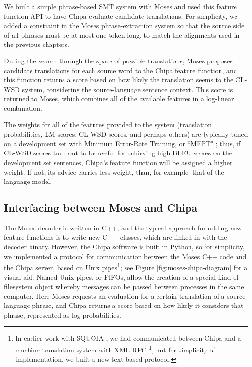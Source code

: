 We built a simple phrase-based SMT system with Moses and used this feature
function API to have Chipa evaluate candidate translations. For simplicity, we
added a constraint in the Moses phrase-extraction system so that the source side
of all phrases must be at most one token long, to match the alignments used in
the previous chapters.

During the search through the space of possible translations, Moses proposes
candidate translations for each source word to the Chipa feature function, and
this function returns a score based on how likely the translation seems to the
CL-WSD system, considering the source-language sentence context. This score is
returned to Moses, which combines all of the available features in a log-linear
combination.

The weights for all of the features provided to the system (translation
probabilities, LM scores, CL-WSD scores, and perhaps others) are typically tuned
on a development set with Minimum Error-Rate Training, or ``MERT"
\cite{och:2003:ACL} ; thus, if CL-WSD scores turn out to be useful for achieving
high BLEU scores on the development set sentences, Chipa's feature function will
be assigned a higher weight. If not, its advice carries less weight, than, for
example, that of the language model.

\subsection{Interfacing between Moses and Chipa}
The Moses decoder is written in C++, and the typical approach for adding new
feature functions is to write new C++ classes, which are linked in with the
decoder binary. However, the Chipa software is built in Python, so for
simplicity, we implemented a protocol for communication between the Moses C++
code and the Chipa server, based on Unix pipes\footnote{In earlier work with
SQUOIA \cite{rudnick:saltmil2014}, we had communicated between Chipa and a
machine translation system with XML-RPC
\footnote{\url{http://xmlrpc.scripting.com/}}, but for simplicity of
implementation, we built a new text-based protocol.}; see Figure
\ref{fig:moses-chipa-diagram} for a visual aid.  Named Unix pipes, or FIFOs,
allow the creation of a special kind of filesystem object whereby messages can
be passed between processes in the same computer.  Here Moses requests an
evaluation for a certain translation of a source-language phrase, and Chipa
returns a score based on how likely it considers that phrase, represented as log
probabilities. 

